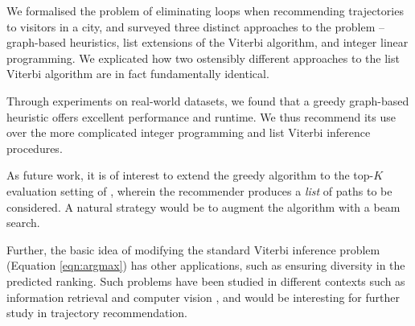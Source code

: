 
We formalised the problem of eliminating loops when recommending trajectories to visitors in a city,
and surveyed three distinct approaches to the problem --
graph-based heuristics,
list extensions of the Viterbi algorithm,
and integer linear programming.
We explicated how two ostensibly different approaches to the list Viterbi algorithm \citep{seshadri1994list,nilsson2001sequentially} are in fact fundamentally identical.

Through experiments on real-world datasets,
we found that
a greedy graph-based heuristic offers excellent performance and runtime.
We thus recommend its use over the more complicated integer programming and list Viterbi inference procedures.



As future work, it is of interest to extend the greedy algorithm to the top-$K$ evaluation setting of \citet{Chen:2017}, wherein the recommender produces a \emph{list} of paths to be considered.
A natural strategy would be to augment the algorithm with a beam search.

Further, the basic idea of modifying the standard Viterbi inference problem (Equation \ref{eqn:argmax}) has other applications, such
as ensuring diversity in the predicted ranking.
Such problems have been studied in different contexts such as information retrieval \citep{Carbonell:1998} and computer vision \citep{Park:2011},
and would be interesting for further study in trajectory recommendation.

